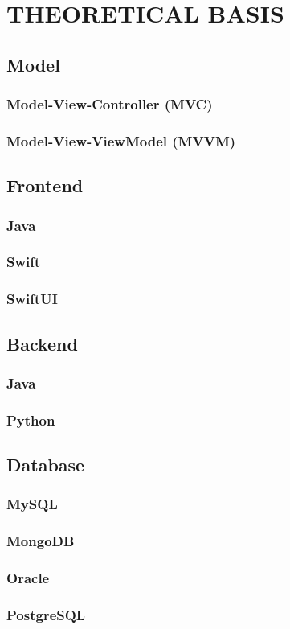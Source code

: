 \section{THEORETICAL BASIS}

\subsection{Model}

\subsubsection{Model-View-Controller (MVC)}

\subsubsection{Model-View-ViewModel (MVVM)}

\subsection{Frontend}

\subsubsection{Java}

\subsubsection{Swift}

\subsubsection{SwiftUI}

\subsection{Backend}

\subsubsection{Java}

\subsubsection{Python}

\subsection{Database}

\subsubsection{MySQL}

\subsubsection{MongoDB}

\subsubsection{Oracle}

\subsubsection{PostgreSQL}